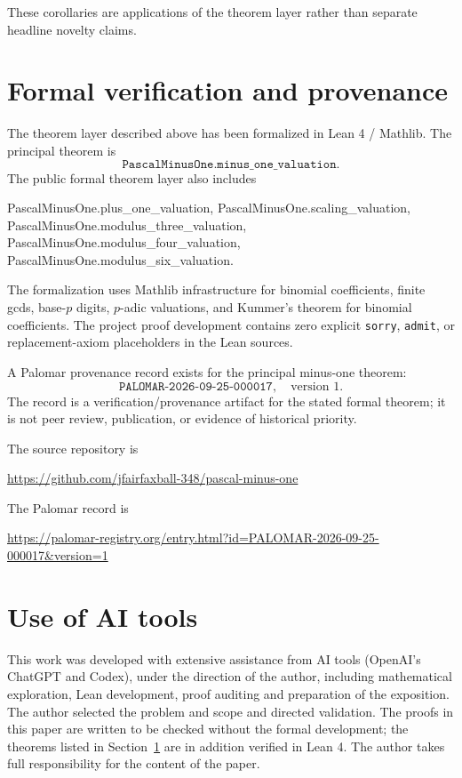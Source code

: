 \documentclass[11pt]{article}
\begin{document}
These corollaries are applications of the theorem layer rather than separate
headline novelty claims.

\section{Formal verification and provenance}\label{sec:formal}

The theorem layer described above has been formalized in Lean 4 / Mathlib.  The
principal theorem is
\[
  \texttt{PascalMinusOne.minus\_one\_valuation}.
\]
The public formal theorem layer also includes
\begin{center}
\begin{minipage}{0.92\linewidth}
\ttfamily\small
PascalMinusOne.plus\_one\_valuation,\quad
PascalMinusOne.scaling\_valuation,\quad
PascalMinusOne.modulus\_three\_valuation,\quad
PascalMinusOne.modulus\_four\_valuation,\quad
PascalMinusOne.modulus\_six\_valuation.
\end{minipage}
\end{center}
The formalization uses Mathlib infrastructure for binomial coefficients, finite
gcds, base-$p$ digits, $p$-adic valuations, and Kummer's theorem for binomial
coefficients.  The project proof development contains zero explicit
\texttt{sorry}, \texttt{admit}, or replacement-axiom placeholders in the Lean
sources.

A Palomar provenance record exists for the principal minus-one theorem:
\[
  \texttt{PALOMAR-2026-09-25-000017},\quad \text{version }1.
\]
The record is a verification/provenance artifact for the stated formal theorem;
it is not peer review, publication, or evidence of historical priority.

The source repository is
\begin{center}
\url{https://github.com/jfairfaxball-348/pascal-minus-one}
\end{center}
The Palomar record is
\begin{center}
\url{https://palomar-registry.org/entry.html?id=PALOMAR-2026-09-25-000017\&version=1}
\end{center}

\section*{Use of AI tools}

This work was developed with extensive assistance from AI tools
(\mbox{OpenAI's} ChatGPT and Codex), under the direction of the author,
including mathematical exploration, Lean development, proof auditing and
preparation of the exposition.  The author selected the problem and scope and
directed validation.  The proofs in this paper are written to be checked
without the formal development; the theorems listed in
Section~\ref{sec:formal} are in addition verified in Lean 4.  The author takes
full responsibility for the content of the paper.
\end{document}
